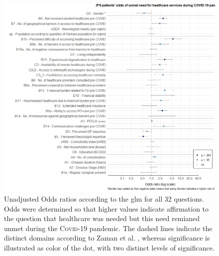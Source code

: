 \documentclass{bmcart}
\begin{document}
\begin{backmatter}
\begin{figure}[!h]
\centering
\includegraphics[width=\textwidth]{fig3.oddsratios.v1.0.jpeg}
\caption{Unadjusted Odds ratios according to the \ac{glm} for all 32 questions. Odds were determined so that higher values indicate affirmation to the question that healthcare was needed but this need remianed unmet during the \textsc{Covid}-19 pandemic. The dashed lines indicate the distinct domains according to Zaman et al. \cite{zaman2021barriers}, whereas significance is illustrated as color of the dot, with two distinct levels of significance. }
\label{fig3:resultsOR1}
\end{figure}


\end{backmatter}
\end{document}
